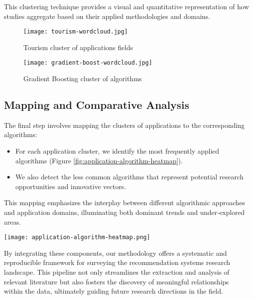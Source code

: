 \documentclass[
	a4paper, %
	10pt, %
	unnumberedsections, %
	twoside, %
]{LTJournalArticle}
\begin{document}
This clustering technique provides a visual and quantitative representation of how studies aggregate based on their applied methodologies and domains.

\begin{figure}[htbp]
    \centering
    \texttt{[image: tourism-wordcloud.jpg]}
    \caption{Tourism cluster of applications fields}
    \label{fig:tourism-wordcloud}
\end{figure}

\begin{figure}[htbp]
    \centering
    \texttt{[image: gradient-boost-wordcloud.jpg]}
    \caption{Gradient Boosting cluster of algorithms}
    \label{fig:gradient-boost-wordcloud}
\end{figure}

\subsection{Mapping and Comparative Analysis}

The final step involves mapping the clusters of applications to the corresponding algorithms:

\begin{itemize}
    \item For each application cluster, we identify the most frequently applied algorithms (Figure \ref{fig:application-algorithm-heatmap}).  
    \item We also detect the less common algorithms that represent potential research opportunities and innovative vectors.
\end{itemize}

This mapping emphasizes the interplay between different algorithmic approaches and application domains, illuminating both dominant trends and under-explored areas.  

\begin{figure*}[htbp]
    \centering
    \texttt{[image: application-algorithm-heatmap.png]}
    \caption{Application x Algorithm HeatMap of Links with more than 65 occurrences}
    \label{fig:application-algorithm-heatmap}
\end{figure*}

By integrating these components, our methodology offers a systematic and reproducible framework for surveying the recommendation systems research landscape. This pipeline not only streamlines the extraction and analysis of relevant literature but also fosters the discovery of meaningful relationships within the data, ultimately guiding future research directions in the field.
\end{document}
